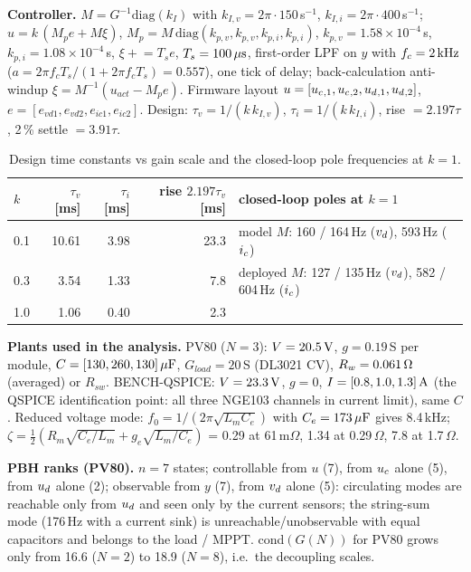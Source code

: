 \textbf{Controller.} $M = G^{-1}\mathrm{diag}(k_I)$ with $k_{I,v} = 2\pi\cdot150$\,s$^{-1}$, $k_{I,i} = 2\pi\cdot400$\,s$^{-1}$; $u = k\,(M_p e + M\xi)$, $M_p = M\,\mathrm{diag}(k_{p,v},k_{p,v},k_{p,i},k_{p,i})$, $k_{p,v} = 1.58\times10^{-4}$\,s, $k_{p,i} = 1.08\times10^{-4}$\,s, $\xi \mathrel{+}= T_s e$, $T_s = 100\us$, first-order LPF on $y$ with $f_c = 2\kHz$ ($a = 2\pi f_c T_s/(1+2\pi f_c T_s) = 0.557$), one tick of delay; back-calculation anti-windup $\xi = M^{-1}(u_{act} - M_p e)$. Firmware layout $u = [\uc{}_{,1},\uc{}_{,2},\ud{}_{,1},\ud{}_{,2}]$, $e = [e_{vd1}, e_{vd2}, e_{ic1}, e_{ic2}]$. Design: $\tau_v = 1/(k\,k_{I,v})$, $\tau_i = 1/(k\,k_{I,i})$, rise $= 2.197\tau$, 2\,\% settle $= 3.91\tau$.

\begin{table}[htbp]\centering\small
\caption{Design time constants vs gain scale and the closed-loop pole frequencies at $k=1$.}
\label{tab:design_tau}
\begin{tabular}{l r r r l}
\toprule
$k$ & $\tau_v$ [ms] & $\tau_i$ [ms] & rise $2.197\tau_v$ [ms] & closed-loop poles at $k=1$\\
\midrule
0.1 & 10.61 & 3.98 & 23.3 & model $M$: 160 / 164\,Hz ($\vd$), 593\,Hz ($\ic$)\\
0.3 & 3.54 & 1.33 & 7.8 & deployed $M$: 127 / 135\,Hz ($\vd$), 582 / 604\,Hz ($\ic$)\\
1.0 & 1.06 & 0.40 & 2.3 & \\
\bottomrule
\end{tabular}
\end{table}

\textbf{Plants used in the analysis.} PV80 ($N=3$): $V = 20.5\V$, $g = 0.19$\,S per module, $C = [130, 260, 130]\uF$, $G_{load} = 20$\,S (DL3021 CV), $R_w = 0.061\ohm$ (averaged) or $R_{sw}$. BENCH-QSPICE: $V = 23.3\V$, $g = 0$, $I = [0.8, 1.0, 1.3]\A$ (the QSPICE identification point: all three NGE103 channels in current limit), same $C$. Reduced voltage mode: $f_0 = 1/(2\pi\sqrt{L_m C_e})$ with $C_e = 173\uF$ gives 8.4\,kHz; $\zeta = \tfrac12(R_m\sqrt{C_e/L_m} + g_e\sqrt{L_m/C_e})$ = 0.29 at 61\,m$\Omega$, 1.34 at 0.29\,$\Omega$, 7.8 at 1.7\,$\Omega$.

\textbf{PBH ranks (PV80).} $n = 7$ states; controllable from $u$ (7), from $\uc$ alone (5), from $\ud$ alone (2); observable from $y$ (7), from $\vd$ alone (5): circulating modes are reachable only from $\ud$ and seen only by the current sensors; the string-sum mode (176\,Hz with a current sink) is unreachable/unobservable with equal capacitors and belongs to the load / MPPT. cond$(G(N))$ for PV80 grows only from 16.6 ($N=2$) to 18.9 ($N=8$), i.e.\ the decoupling scales.

